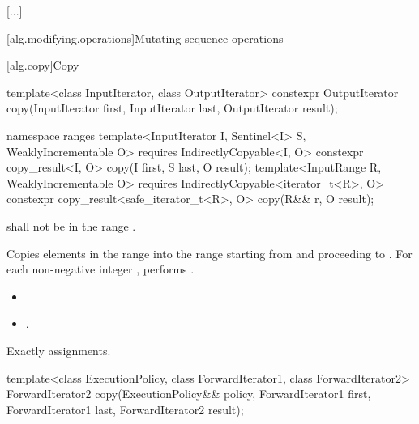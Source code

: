 [...]

[alg.modifying.operations]{Mutating sequence operations}

[alg.copy]{Copy}

%
\begin{itemdecl}
template<class InputIterator, class OutputIterator>
  constexpr OutputIterator copy(InputIterator first, InputIterator last,
                                OutputIterator result);
\end{itemdecl}\begin{addedblock}\begin{itemdecl}
namespace ranges {
  template<InputIterator I, Sentinel<I> S, WeaklyIncrementable O>
    requires IndirectlyCopyable<I, O>
    constexpr copy_result<I, O>
      copy(I first, S last, O result);
  template<InputRange R, WeaklyIncrementable O>
    requires IndirectlyCopyable<iterator_t<R>, O>
    constexpr copy_result<safe_iterator_t<R>, O>
      copy(R&& r, O result);
}
\end{itemdecl}\end{addedblock}

\begin{itemdescr}
\pnum
\requires {} shall not be in the range .

\pnum
\effects
Copies elements in the range 
into the range 
starting from  and proceeding to .
For each non-negative integer 
, performs
.

\pnum
\returns
\begin{itemize}
\item {} 
\item {}.
\end{itemize}

\pnum
\complexity Exactly  assignments.
\end{itemdescr}

%
\begin{itemdecl}
template<class ExecutionPolicy, class ForwardIterator1, class ForwardIterator2>
  ForwardIterator2 copy(ExecutionPolicy&& policy,
                        ForwardIterator1 first, ForwardIterator1 last,
                        ForwardIterator2 result);
\end{itemdecl}

